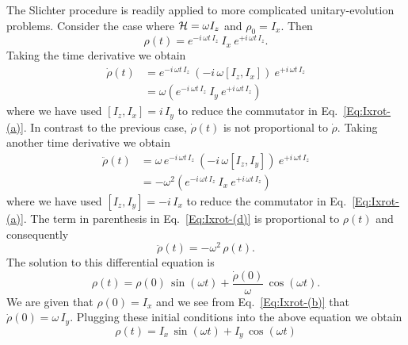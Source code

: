 The Slichter procedure is readily applied to more complicated unitary-evolution problems.  Consider the case where ${\cal H} = \omega I_z$ and $\rho_0 = I_x$.  Then
\begin{equation}
\rho(t) 
	= e^{-i \, \omega t \, I_z} \: I_x \: e^{+i \, \omega t \, I_z}.
\end{equation}
Taking the time derivative we obtain
\begin{subequations}  
\begin{align}
\dot{\rho}(t)
	& = e^{-i \, \omega t \, I_z} \: 
		(-i \, \omega [I_z,I_x] ) 
		\: e^{+i \, \omega t \, I_z} 
		\label{Eq:Ixrot-(a)} \\
	& = \omega \left( 
			e^{-i \, \omega t \, I_z} \: I_y \: e^{+i \, \omega t \, I_z} 
		\right)
		\label{Eq:Ixrot-(b)}
\end{align}
\end{subequations} 
where we have used $[I_z,I_x] = i \, I_y$ to reduce the commutator in Eq.~\ref{Eq:Ixrot-(a)}.  In contrast to the previous case, $\dot{\rho}(t)$ is not proportional to $\dot{\rho}$.  Taking another time derivative we obtain
\begin{subequations}  
\begin{align}
\ddot{\rho}(t)
	& = \omega \, e^{-i \, \omega t \, I_z} \: 
		(-i \, \omega [I_z,I_y] ) 
		\: e^{+i \, \omega t \, I_z} 
		\label{Eq:Ixrot-(c)} \\
	& = - \omega^2 \left( 
			e^{-i \, \omega t \, I_z} \: I_x \: e^{+i \, \omega t \, I_z} 
		\right)
		\label{Eq:Ixrot-(d)}
\end{align}
\end{subequations} 
where we have used $[I_z,I_y] = -i \, I_x$ to reduce the commutator in Eq.~\ref{Eq:Ixrot-(a)}. The term in parenthesis in Eq.~\ref{Eq:Ixrot-(d)} is proportional to $\rho(t)$ and consequently
\begin{equation}
\ddot{\rho}(t) = - \omega^2 \, \rho(t). \label{Eq:Ixrot-ODE}
\end{equation}
The solution to this differential equation is
\begin{equation}
\rho(t) = \rho(0) \, \sin{(\omega t)} + \frac{\dot{\rho}(0)}{\omega} \, \cos{(\omega t)}.
\end{equation}
We are given that $\rho(0) = I_x$ and we see from Eq.~\ref{Eq:Ixrot-(b)} that $\dot{\rho}(0) = \omega \, I_y$.  Plugging these initial conditions into the above equation we obtain
\begin{equation}
\rho(t) = I_x \, \sin{(\omega t)} + I_y \, \cos{(\omega t)}
\end{equation}

